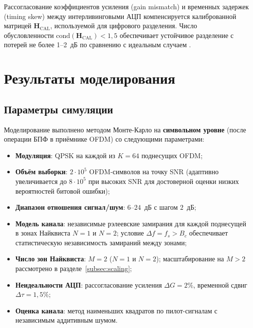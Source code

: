 \documentclass[a4paper,12pt]{article}
\numberwithin{equation}{section}
\begin{document}
Рассогласование коэффициентов усиления (gain mismatch) и временных задержек (timing skew) между интерливинговыми АЦП компенсируется калиброванной матрицей $\mathbf{H}_\text{CAL}$, используемой для цифрового разделения. Число обусловленности $\text{cond}(\mathbf{H}_\text{CAL}) < 1{,}5$ обеспечивает устойчивое разделение с потерей не более 1--2~дБ по сравнению с идеальным случаем \cite{elbornsson}.

\section{Результаты моделирования}
\label{sec:results}

\subsection{Параметры симуляции}
\label{subsec:sim_setup}

Моделирование выполнено методом Монте-Карло на \textbf{символьном уровне} 
(после операции БПФ в приёмнике OFDM) со следующими параметрами:
\begin{itemize}
    \item \textbf{Модуляция}: QPSK на каждой из $K = 64$ поднесущих OFDM;
    \item \textbf{Объём выборки}: $2\cdot10^5$ OFDM-символов на точку SNR 
    (адаптивно увеличивается до $8\cdot10^5$ при высоких SNR для достоверной 
    оценки низких вероятностей битовой ошибки);
    \item \textbf{Диапазон отношения сигнал/шум}: $6$--$24$~дБ с шагом $2$~дБ;
    \item \textbf{Модель канала}: независимые рэлеевские замирания для каждой 
    поднесущей в зонах Найквиста $N=1$ и $N=2$; условие $\Delta f = f_s > B_c$ 
    обеспечивает статистическую независимость замираний между зонами;
    \item \textbf{Число зон Найквиста}: $M = 2$ ($N=1$ и $N=2$); 
    масштабирование на $M > 2$ рассмотрено в разделе~\ref{subsec:scaling};
    \item \textbf{Неидеальности АЦП}: рассогласование усиления $\Delta G = 2\%$, 
    временной сдвиг $\Delta\tau = 1{,}5\%$;
    \item \textbf{Оценка канала}: метод наименьших квадратов по пилот-сигналам 
    с независимым аддитивным шумом.
\end{itemize}
\end{document}
